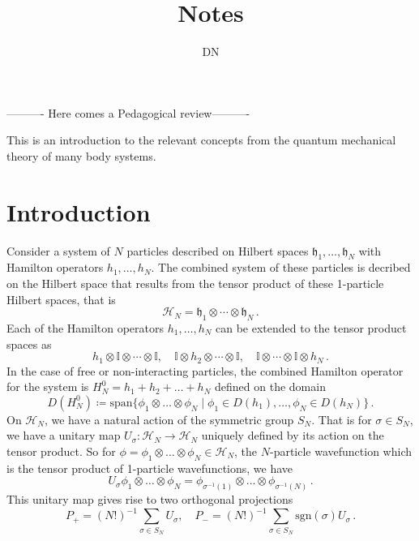 \documentclass[12pt,a4paper]{article}
\title{Notes}
\author[1,*]{DN}
\numberwithin{equation}{section}
\newcommand{\1}{\mathbb{I}}
\newcommand{\h}{\mathfrak{h}}
\newcommand{\HH}{\mathcal{H}}
\theoremstyle{plain}
\theoremstyle{definition}
\theoremstyle{remark}
\theoremstyle{plain}
\theoremstyle{definition}
\theoremstyle{remark}
\begin{document}
	\maketitle
	\medskip
---------- Here comes a Pedagogical review----------		

This is an introduction to the relevant concepts from the quantum mechanical theory of many body systems.
\section{Introduction}	
Consider a system of $N$ particles described on Hilbert spaces $\h_1,\ldots,\h_N$ with Hamilton operators $h_1,\ldots,h_N$. The combined system of these particles is decribed on the Hilbert space that results from the tensor product of these 1-particle Hilbert spaces, that is 
\begin{equation}
	\HH_N = \h_1\otimes\cdots\otimes\h_N\,.
\end{equation}
Each of the Hamilton operators $h_1,\ldots,h_N$ can be extended to the tensor product spaces as
\begin{equation}
	h_1 \otimes\1\otimes\cdots\otimes\1,\quad \1\otimes h_2\otimes\cdots\otimes\1,\quad \1\otimes\cdots\otimes \1 \otimes h_N\,.
\end{equation}
In the case of free or non-interacting particles, the combined Hamilton operator for the system is $H_N^0 = h_1+h_2+\ldots+h_N$ defined on the domain
\begin{equation}
	D(H_N^0) \coloneq \mathrm{span}\{\phi_1\otimes\ldots\otimes\phi_N \;|\; \phi_1 \in D(h_1), \dots, \phi_N \in D(h_N)\}\,.
\end{equation}
On $\HH_N$, we have a natural action of the symmetric group $S_N$. That is for $\sigma \in S_N$, we have a unitary map $U_\sigma: \HH_N \rightarrow\HH_N $ uniquely defined by its action on the tensor product. So for $\phi = \phi_1\otimes\ldots\otimes\phi_N \in \HH_N$, the $N$-particle wavefunction which is the tensor product of 1-particle wavefunctions, we have
\begin{equation}
	U_\sigma \phi_1\otimes\ldots\otimes\phi_N = \phi_{\sigma^{-1}(1)} \otimes \ldots \otimes \phi_{\sigma^{-1}(N)}\,.
\end{equation}
This unitary map gives rise to two orthogonal projections
\begin{equation}
	P_+ = (N!)^{-1} \sum\limits_{\sigma \in S_N} U_\sigma , \quad  P_- = (N!)^{-1} \sum\limits_{\sigma \in S_N} \mathrm{sgn}(\sigma)U_\sigma\,.
\end{equation}
\end{document}
